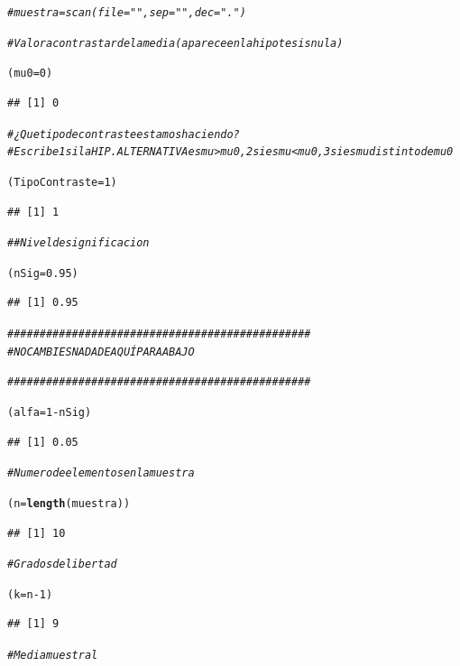 \documentclass[10pt,a4paper]{article}\usepackage[]{graphicx}\usepackage[]{color}
\makeatletter
\newcommand{\hlnum}[1]{\textcolor[rgb]{0.686,0.059,0.569}{#1}}%
\newcommand{\hlcom}[1]{\textcolor[rgb]{0.678,0.584,0.686}{\textit{#1}}}%
\newcommand{\hlopt}[1]{\textcolor[rgb]{0,0,0}{#1}}%
\newcommand{\hlstd}[1]{\textcolor[rgb]{0.345,0.345,0.345}{#1}}%
\newcommand{\hlkwb}[1]{\textcolor[rgb]{0.69,0.353,0.396}{#1}}%
\newcommand{\hlkwd}[1]{\textcolor[rgb]{0.737,0.353,0.396}{\textbf{#1}}}%
\newenvironment{kframe}{%
 \def\at@end@of@kframe{}%
 \ifinner\ifhmode%
  \def\at@end@of@kframe{\end{minipage}}%
  \begin{minipage}{\columnwidth}%
 \fi\fi%
 \def\FrameCommand##1{\hskip\@totalleftmargin \hskip-\fboxsep
 \colorbox{shadecolor}{##1}\hskip-\fboxsep
     \hskip-\linewidth \hskip-\@totalleftmargin \hskip\columnwidth}%
 \MakeFramed {\advance\hsize-\width
   \@totalleftmargin\z@ \linewidth\hsize
   \@setminipage}}%
 {\par\unskip\endMakeFramed%
 \at@end@of@kframe}
\newenvironment{knitrout}{}{} %
\newcounter {cont01}
\makeatother
\begin{document}
\begin{knitrout}
\begin{kframe}
\begin{alltt}
\hlcom{#muestra = scan(file="",sep=" ",dec=".")}


\hlcom{# Valor a contrastar de la media (aparece en la hipotesis nula)}

\hlstd{(mu0} \hlkwb{=} \hlnum{0}\hlstd{)}
\end{alltt}
\begin{verbatim}
## [1] 0
\end{verbatim}
\begin{alltt}
\hlcom{# ¿Que tipo de contraste estamos haciendo?}
\hlcom{# Escribe 1 si la HIP. ALTERNATIVA es mu > mu0, 2 si es mu < mu0, 3 si es mu distinto de mu0}

\hlstd{(TipoContraste} \hlkwb{=} \hlnum{1}\hlstd{)}
\end{alltt}
\begin{verbatim}
## [1] 1
\end{verbatim}
\begin{alltt}
\hlcom{##Nivel de significacion}

\hlstd{(nSig} \hlkwb{=} \hlnum{0.95}\hlstd{)}
\end{alltt}
\begin{verbatim}
## [1] 0.95
\end{verbatim}
\begin{alltt}
\hlcom{###############################################}
\hlcom{# NO CAMBIES NADA DE AQUÍ PARA ABAJO}

\hlcom{###############################################}


\hlstd{(alfa} \hlkwb{=} \hlnum{1} \hlopt{-} \hlstd{nSig)}
\end{alltt}
\begin{verbatim}
## [1] 0.05
\end{verbatim}
\begin{alltt}
\hlcom{# Numero de elementos en la muestra}

\hlstd{(n} \hlkwb{=} \hlkwd{length}\hlstd{(muestra))}
\end{alltt}
\begin{verbatim}
## [1] 10
\end{verbatim}
\begin{alltt}
\hlcom{# Grados de libertad}

\hlstd{(k} \hlkwb{=} \hlstd{n} \hlopt{-} \hlnum{1}\hlstd{)}
\end{alltt}
\begin{verbatim}
## [1] 9
\end{verbatim}
\begin{alltt}
\hlcom{# Media muestral}


\end{alltt}
\end{kframe}
\end{knitrout}
\end{document}
